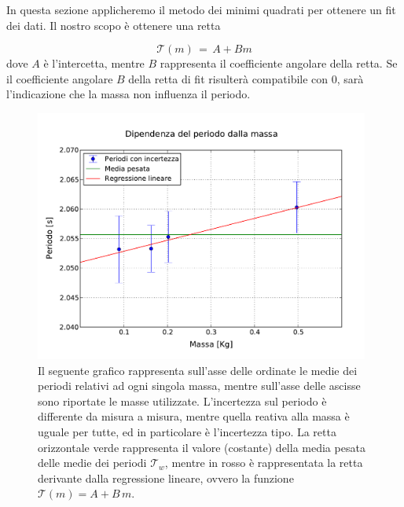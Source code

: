 In questa sezione applicheremo il metodo dei minimi quadrati per ottenere un fit dei dati.
Il nostro scopo è ottenere una retta

\begin{equation}
	\mathcal{T}(m) \,=\, A + B m 
\end{equation}
%
dove $A$ è l'intercetta, mentre $B$ rappresenta il coefficiente angolare della retta. Se il coefficiente angolare $B$ della 
retta di fit risulterà compatibile con 0, sarà l'indicazione che la massa non influenza il periodo. 

\begin{figure}
    \centering
    \includegraphics[width=110mm]{immagini/masse.pdf}
    \caption{Il seguente grafico rappresenta sull'asse delle ordinate le medie dei periodi relativi ad ogni
        singola massa, mentre sull'asse delle ascisse sono riportate le masse utilizzate. L'incertezza sul periodo
        è differente da misura a misura, mentre quella reativa alla massa è uguale per tutte, ed in particolare è
        l'incertezza tipo. La retta orizzontale verde rappresenta il valore (costante) della media pesata delle medie
        dei periodi $\mathcal{T}_w$, mentre in rosso è rappresentata la retta derivante dalla regressione lineare,
        ovvero la funzione $\mathcal{T}(m) = A + B\,m$.}
    \label{fig:masse_periodi}
\end{figure}


